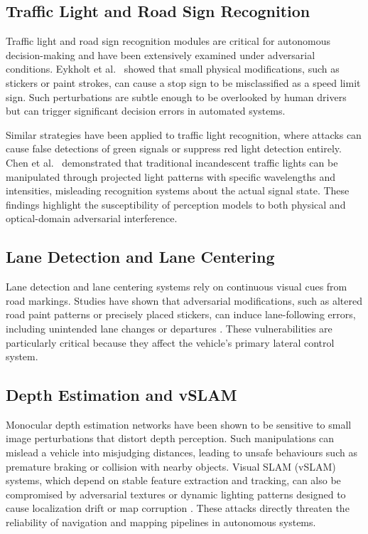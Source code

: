 \subsection{Traffic Light and Road Sign Recognition}

Traffic light and road sign recognition modules are critical for autonomous decision-making and have been extensively examined under adversarial conditions.
Eykholt et al.\ \cite{10.11453319535.3354259} showed that small physical modifications, such as stickers or paint strokes, can cause a stop sign to be misclassified as a speed limit sign.
Such perturbations are subtle enough to be overlooked by human drivers but can trigger significant decision errors in automated systems.

Similar strategies have been applied to traffic light recognition, where attacks can cause false detections of green signals or suppress red light detection entirely.
Chen et al.\ \cite{277268} demonstrated that traditional incandescent traffic lights can be manipulated through projected light patterns with specific wavelengths and intensities, misleading recognition systems about the actual signal state.
These findings highlight the susceptibility of perception models to both physical and optical-domain adversarial interference.

\subsection{Lane Detection and Lane Centering}

Lane detection and lane centering systems rely on continuous visual cues from road markings.
Studies have shown that adversarial modifications, such as altered road paint patterns or precisely placed stickers, can induce lane-following errors, including unintended lane changes or departures \cite{sato2021robustnesslanedetectionmodels} \cite{274691}.
These vulnerabilities are particularly critical because they affect the vehicle’s primary lateral control system.

\subsection{Depth Estimation and vSLAM}

Monocular depth estimation networks have been shown to be sensitive to small image perturbations that distort depth perception.
Such manipulations can mislead a vehicle into misjudging distances, leading to unsafe behaviours such as premature braking or collision with nearby objects.
Visual SLAM (vSLAM) systems, which depend on stable feature extraction and tracking, can also be compromised by adversarial textures or dynamic lighting patterns designed to cause localization drift or map corruption \cite{299539}.
These attacks directly threaten the reliability of navigation and mapping pipelines in autonomous systems.

